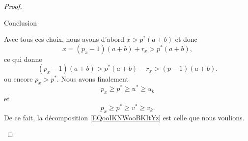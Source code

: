 \begin{proof}
\begin{subproof}
\item[Conclusion]

    Avec tous ces choix, nous avons d'abord \( x>p^*(a+b)\) et donc
    \begin{equation}
        x=(p_x-1)(a+b)+r_x>p^*(a+b),
    \end{equation}
    ce qui donne
    \begin{equation}
        (p_x-1)(a+b)>p^*(a+b)-r_x>(p-1)(a+b).
    \end{equation}
    ou encore \( p_x>p^*\). Nous avons finalement
    \begin{equation}
       p_x \geq p^* \geq u^* \geq u_k
    \end{equation}
    et
    \begin{equation}
       p_x \geq p^* \geq v^* \geq v_k.
    \end{equation}
    De ce fait, la décomposition \eqref{EQooIKNWooBKItYz} est celle que nous voulions.
    \end{subproof}
\end{proof}


%

